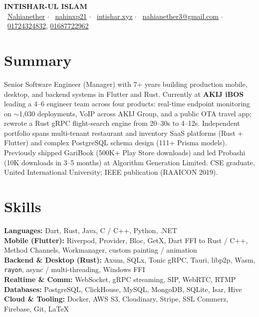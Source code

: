 \documentclass[a4paper,10pt]{article}
\begin{document}
\begin{center}
    \LARGE{\textbf{INTISHAR-UL ISLAM}} \\
    {\small 
    \faGithub\ \href{https://github.com/Nahianether}{Nahianether} $\cdot$
    \faLinkedin\ \href{https://www.linkedin.com/in/nahinxp21}{nahinxp21} $\cdot$
    \faGlobe\ \href{https://intishar.xyz}{intishar.xyz} $\cdot$
    \faEnvelope\ \href{mailto:nahianether3@gmail.com}{nahianether3@gmail.com} $\cdot$
    \faPhone\ \href{tel:+8801724324832}{01724324832}, \href{tel:+8801687722962}{01687722962}} \\

\end{center}
\vspace{-5mm}

\section*{Summary}
\vspace{-4mm}
Senior Software Engineer (Manager) with 7+ years building production mobile, desktop, and backend systems in Flutter and Rust. Currently at \textbf{AKIJ iBOS} leading a 4--6 engineer team across four products: real-time endpoint monitoring on $\sim$1{,}030 deployments, VoIP across AKIJ Group, and a public OTA travel app; rewrote a Rust gRPC flight-search engine from 20--30s to 4--12s. Independent portfolio spans multi-tenant restaurant and inventory SaaS platforms (Rust + Flutter) and complex PostgreSQL schema design (111+ Prisma models). Previously shipped GariBook (500K+ Play Store downloads) and led Probashi (10K downloads in 3--5 months) at Algorithm Generation Limited. CSE graduate, United International University; IEEE publication (RAAICON 2019).
\vspace{-5mm}

\section*{Skills}
\vspace{-4mm}
\textbf{Languages:} Dart, Rust, Java, C / C++, Python, .NET \\[0.3em]
\textbf{Mobile (Flutter):} Riverpod, Provider, Bloc, GetX, Dart FFI to Rust / C++, Method Channels, Workmanager, custom painting / animation \\[0.3em]
\textbf{Backend \& Desktop (Rust):} Axum, SQLx, Tonic gRPC, Tauri, libp2p, Wasm, \texttt{rayon}, async / multi-threading, Windows FFI \\[0.3em]
\textbf{Realtime \& Comm:} WebSocket, gRPC streaming, SIP, WebRTC, RTMP \\[0.3em]
\textbf{Databases:} PostgreSQL, ClickHouse, MySQL, MongoDB, SQLite, Isar, Hive \\[0.3em]
\textbf{Cloud \& Tooling:} Docker, AWS S3, Cloudinary, Stripe, SSL Commerz, Firebase, Git, LaTeX
\vspace{-5mm}
\end{document}
